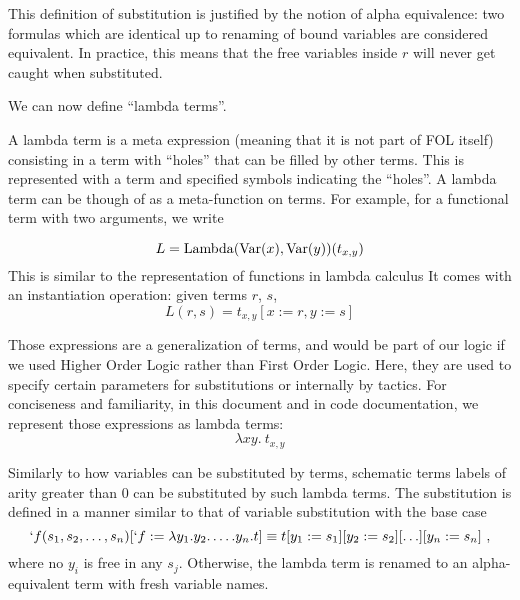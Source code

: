 This definition of substitution is justified by the notion of alpha equivalence: two formulas which are identical up to renaming of bound variables are considered equivalent. In practice, this means that the free variables inside $r$ will never get caught when substituted.

We can now define \enquote{lambda terms}.
\begin{defin}
  A lambda term is a  meta expression (meaning that it is not part of FOL itself) consisting in a term with ``holes'' that can be filled by other terms. This is represented with a term and specified symbols indicating the ``holes''.
  A lambda term can be though of as a meta-function on terms. For example, for a functional term with two arguments, we write

  $$
    L = \operatorname{Lambda}(\operatorname{Var}(x), \operatorname{Var}(y))(t_{x,y})
  $$
  This is similar to the representation of functions in lambda calculus
  It comes with an instantiation operation: given terms $r$, $s$,
  $$L(r, s) = t_{x, y}[x := r, y := s]$$
\end{defin}
Those expressions are a generalization of terms, and would be part of our logic if we used Higher Order Logic rather than First Order Logic. Here, they are used to specify certain parameters for substitutions or internally by tactics. For conciseness and familiarity, in this document and in code documentation, we represent those expressions as lambda terms:
$$\lambda x y.~ t_{x,y}$$

Similarly to how variables can be substituted by terms, schematic terms labels of arity greater than 0 can be substituted by such lambda terms.
The substitution is defined in a manner similar to that of variable substitution with the base case
%
\begin{equation*}
  `f(s_1, s_2, \ldots, s_n)[`f := \lambda y_1.y_2.\ldots.y_n. t] \equiv t[y_1 := s_1][y_2 := s_2][\ldots][y_n := s_n]~,
\end{equation*}
%
where no $y_i$ is free in any $s_j$. Otherwise, the lambda term is renamed to an alpha-equivalent term with fresh variable names.

